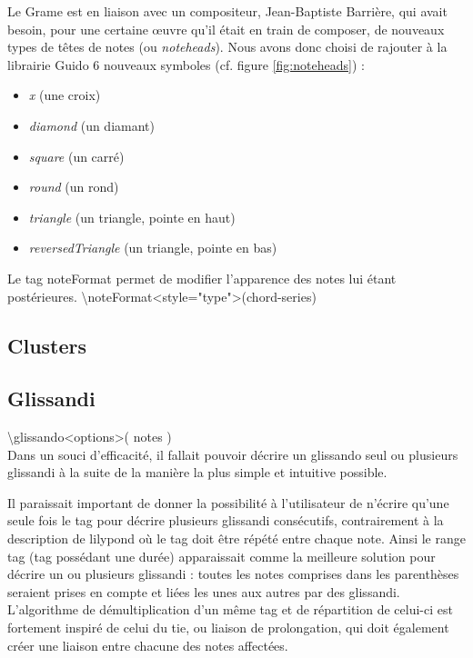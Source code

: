 \documentclass[a4paper,10pt,twocolumn]{article}
\newenvironment{code}
  {\fontfamily{pnc}\selectfont}{}
\begin{document}
Le Grame est en liaison avec un compositeur, Jean-Baptiste Barrière, qui avait besoin, pour une certaine œuvre qu'il était en train de composer, de nouveaux types de têtes de notes (ou \emph{noteheads}).
Nous avons donc choisi de rajouter à la librairie Guido 6 nouveaux symboles (cf. figure \ref{fig:noteheads}) :
%
\begin{itemize}
    \item \emph{x} (une croix)
    \item \emph{diamond} (un diamant)
    \item \emph{square} (un carré)
    \item \emph{round} (un rond)
    \item \emph{triangle} (un triangle, pointe en haut)
    \item \emph{reversedTriangle} (un triangle, pointe en bas)
\end{itemize} 
%
Le tag \begin{code}noteFormat\end{code} permet de modifier l'apparence des notes lui étant postérieures.
\begin{code}
\textbackslash{}noteFormat\textless{}style="type"\textgreater{}(chord-series)
\end{code}

\newpage

\subsection{Clusters}


\newpage

\subsection{Glissandi}

\begin{code}
\textbackslash{}glissando\textless{}options\textgreater{}( notes )
\end{code}
\\

Dans un souci d'efficacité, il fallait pouvoir décrire un glissando seul ou plusieurs glissandi à la suite de la manière la plus simple et intuitive possible. 

Il paraissait important de donner la possibilité à l'utilisateur de n'écrire qu'une seule fois le tag pour décrire plusieurs glissandi consécutifs, contrairement à la description de lilypond où le tag doit être répété entre chaque note. Ainsi le range tag (tag possédant une durée) apparaissait comme la meilleure solution pour décrire un ou plusieurs glissandi : toutes les notes comprises dans les parenthèses seraient prises en compte et liées les unes aux autres par des glissandi. L'algorithme de démultiplication d'un même tag et de répartition de celui-ci est fortement inspiré de celui du tie, ou liaison de prolongation, qui doit également créer une liaison entre chacune des notes affectées.
\end{document}
